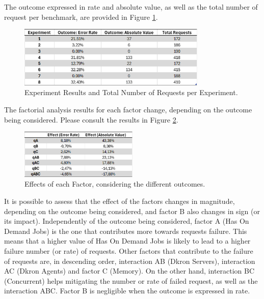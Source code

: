 \documentclass[runningheads]{llncs}
\begin{document}
The outcome expressed in rate and absolute value, as well as the total number of request per benchmark, are provided in Figure \ref{fig:results_totrequests}.

\begin{figure}[H]
    \centering
    \includegraphics[width=0.8\textwidth]{media/factorial_outcome_per_y_plus_totrequests.png}
    \caption{Experiment Results and Total Number of Requests per Experiment.}
    \label{fig:results_totrequests}
\end{figure}

The factorial analysis results for each factor change, depending on the outcome being considered. Please consult the results in Figure \ref{fig:factors_effects}.

\begin{figure}[H]
    \centering
    \includegraphics[width=0.5\textwidth]{media/Effects_Factors.png} \caption{Effects of each Factor, considering the different outcomes.}
    \label{fig:factors_effects}
\end{figure}

It is possible to assess that the effect of the factors changes in magnitude, depending on the outcome being considered, and factor B also changes in sign (or its impact).
Independently of the outcome being considered, factor A (Has On Demand Jobs) is
the one that contributes more towards requests failure. This means that a
higher value of Has On Demand Jobs is likely to lead to a higher failure number
(or rate) of requests. Other factors that contribute to the failure of requests are,
in descending order, interaction AB (Dkron Servers), interaction AC
(Dkron Agents) and factor C (Memory). On the other hand, interaction BC (Concurrent)
helps mitigating the number or rate of failed request, as well as the interaction ABC.
Factor B is negligible when the outcome is expressed in rate.
\end{document}
